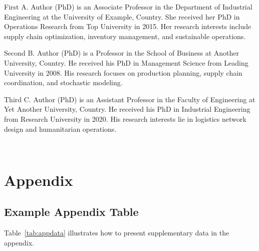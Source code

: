 \documentclass[preprint]{oscmjournal}
\begin{document}
\begin{strip}
\biographies
\vspace{1em}

\begin{biography}{First A. Author}
(PhD) is an Associate Professor in the Department of Industrial Engineering at the University of Example, Country.
She received her PhD in Operations Research from Top University in 2015.
Her research interests include supply chain optimization, inventory management, and sustainable operations.
\end{biography}
\vspace{1em}

\begin{biography}{Second B. Author}
(PhD) is a Professor in the School of Business at Another University, Country.
He received his PhD in Management Science from Leading University in 2008.
His research focuses on production planning, supply chain coordination, and stochastic modeling.
\end{biography}
\vspace{1em}

\begin{biography}{Third C. Author}
(PhD) is an Assistant Professor in the Faculty of Engineering at Yet Another University, Country.
He received his PhD in Industrial Engineering from Research University in 2020.
His research interests lie in logistics network design and humanitarian operations.
\end{biography}
\end{strip}



~ %

\onecolumn
\appendix
\section{Appendix}

\subsection{Example Appendix Table}

Table~\ref{tab:appdata} illustrates how to present supplementary data in the appendix.
\end{document}

